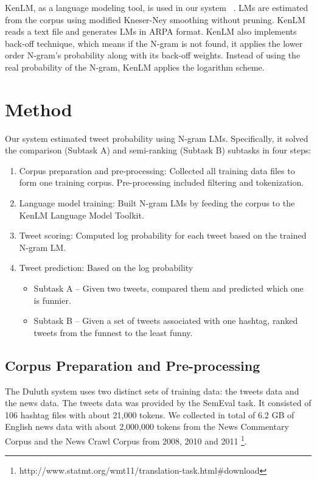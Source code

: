 \documentclass[11pt,a4paper]{article}
\begin{document}
KenLM, as a language modeling tool, is used in our system ~\cite{Heafield-estimate}. LMs are estimated from the corpus using modified Kneser-Ney smoothing without pruning. KenLM reads a text file and generates LMs in ARPA format. KenLM also implements back-off technique, which means if the N-gram is not found, it applies the lower order N-gram's probability along with its back-off weights. Instead of using the real probability of the N-gram, KenLM applies the logarithm scheme.

\section{Method}
Our system estimated tweet probability using N-gram LMs. Specifically, it solved the comparison (Subtask A) and semi-ranking (Subtask B) subtasks in four steps:
\begin{enumerate}
\item Corpus preparation and pre-processing: Collected all training data files to form one training corpus. Pre-processing included filtering and tokenization.
\item Language model training: Built N-gram LMs by feeding the corpus to the KenLM Language Model Toolkit. 
\item Tweet scoring: Computed log probability for each tweet based on the trained N-gram LM.
\item Tweet prediction: Based on the log probability
\begin{itemize}
\item Subtask A -- Given two tweets, compared them and predicted which one is funnier. 
\item Subtask B -- Given a set of tweets associated with one hashtag, ranked tweets from the funnest to the least funny.
\end{itemize}
\end{enumerate}

\subsection{Corpus Preparation and Pre-processing}
The Duluth system uses two distinct sets of training data: the tweets data and the news data. The tweets data was provided by the SemEval task. It consisted of 106 hashtag files with about 21,000 tokens. We collected in total of 6.2 GB of English news data with about 2,000,000 tokens from the News Commentary Corpus and the News Crawl Corpus from 2008, 2010 and 2011 \footnote{http://www.statmt.org/wmt11/translation-task.html\#download}.   
\end{document}
